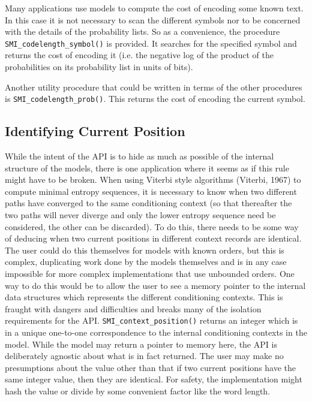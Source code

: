 \documentclass[11pt]{article}
\begin{document}
Many applications use models to compute the cost of encoding some known text. In
this case it is not necessary to scan the different symbols nor to be
concerned with the details of the probability lists. So as a convenience, the
procedure \verb|SMI_codelength_symbol()| is provided. It searches for the
specified symbol and returns the cost of encoding it (i.e. the negative log of
the product of the probabilities on its probability list in units of bits).

Another utility procedure that could be written in terms of the other
procedures is \verb|SMI_codelength_prob()|. This returns the cost of encoding
the current symbol.

\subsection{Identifying Current Position}

While the intent of the API is to hide as much as possible of the internal
structure of the models, there is one application where it seems as if this
rule might have to be broken. When using Viterbi style algorithms (Viterbi,
1967) to compute minimal entropy sequences, it is necessary to know when two
different paths have converged to the same conditioning context (so that
thereafter the two paths will never diverge and only the lower entropy
sequence need be considered, the other can be discarded). To do this, there
needs to be some way of deducing when two current positions in different
context records are identical. The user could do this themselves for models
with known orders, but this is complex, duplicating work done by the models
themselves and is in any case impossible for more complex implementations
that use unbounded orders. One way to do this would be to allow the user to
see a memory pointer to the internal data structures which represents the
different conditioning contexts. This is fraught with dangers and
difficulties and breaks many of the isolation requirements for the API.
\verb|SMI_context_position()| returns an integer which is in a unique
one-to-one correspondence to the internal conditioning contexts in the
model.  While the model may return a pointer to memory here, the API is
deliberately agnostic about what is in fact returned. The user may make no
presumptions about the value other than that if two current positions have
the same integer value, then they are identical. For safety, the
implementation might hash the value or divide by some convenient factor
like the word length.
\end{document}

